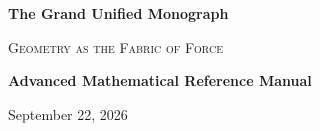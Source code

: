 \documentclass[11pt,a4paper]{article}
\begin{document}
\begin{titlepage}
    \pagestyle{empty} 
    \centering
    \vspace*{3cm}
    
    {\Huge\bfseries The Grand Unified Monograph \par}
    \vspace{0.8cm}
    {\Large\scshape Geometry as the Fabric of Force \par}
    
    \vspace{2cm}
    {\large\bfseries Advanced Mathematical Reference Manual \par}
    
    \vfill
    
    
    \vfill
    
    {\large September 22, 2026 \par}
    \vspace*{2cm}
\end{titlepage}
\newpage

\begin{abstract}
\noindent This monograph establishes a continuous mathematical framework linking classical planetary orbits, non-Abelian gauge fields, pseudo-Riemannian spacetime geometry, and non-perturbative quantum gravitational horizons into a single unified geometric formalism.
\end{abstract}

\tableofcontents
\newpage
\end{document}
